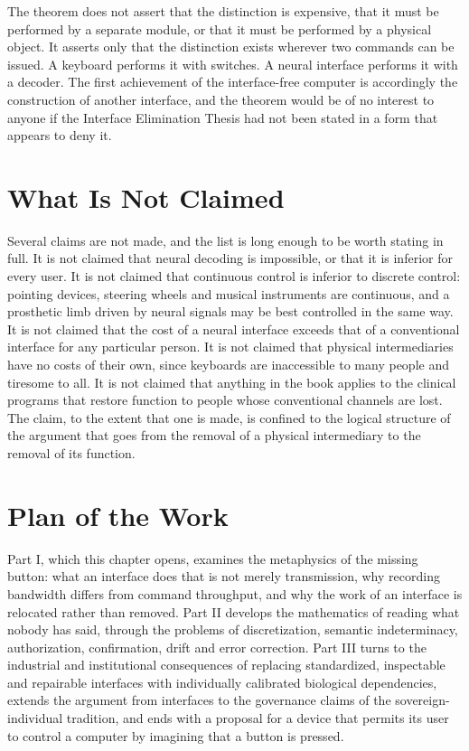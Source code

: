 \documentclass[11pt,twoside,openany]{book}
\theoremstyle{definition}
\theoremstyle{remark}
\begin{document}
The theorem does not assert that the distinction is expensive, that it must be performed by a separate module, or that it must be performed by a physical object. It asserts only that the distinction exists wherever two commands can be issued. A keyboard performs it with switches. A neural interface performs it with a decoder. The first achievement of the interface-free computer is accordingly the construction of another interface, and the theorem would be of no interest to anyone if the Interface Elimination Thesis had not been stated in a form that appears to deny it.

\section{What Is Not Claimed}

Several claims are not made, and the list is long enough to be worth stating in full. It is not claimed that neural decoding is impossible, or that it is inferior for every user. It is not claimed that continuous control is inferior to discrete control: pointing devices, steering wheels and musical instruments are continuous, and a prosthetic limb driven by neural signals may be best controlled in the same way. It is not claimed that the cost of a neural interface exceeds that of a conventional interface for any particular person. It is not claimed that physical intermediaries have no costs of their own, since keyboards are inaccessible to many people and tiresome to all. It is not claimed that anything in the book applies to the clinical programs that restore function to people whose conventional channels are lost. The claim, to the extent that one is made, is confined to the logical structure of the argument that goes from the removal of a physical intermediary to the removal of its function.

\section{Plan of the Work}

Part I, which this chapter opens, examines the metaphysics of the missing button: what an interface does that is not merely transmission, why recording bandwidth differs from command throughput, and why the work of an interface is relocated rather than removed. Part II develops the mathematics of reading what nobody has said, through the problems of discretization, semantic indeterminacy, authorization, confirmation, drift and error correction. Part III turns to the industrial and institutional consequences of replacing standardized, inspectable and repairable interfaces with individually calibrated biological dependencies, extends the argument from interfaces to the governance claims of the sovereign-individual tradition, and ends with a proposal for a device that permits its user to control a computer by imagining that a button is pressed.
\end{document}
